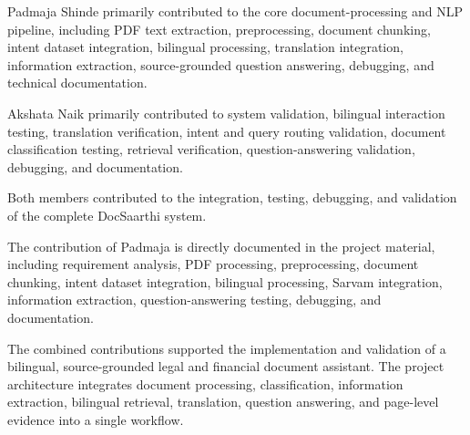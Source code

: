 Padmaja Shinde primarily contributed to the core document-processing
and NLP pipeline, including PDF text extraction, preprocessing,
document chunking, intent dataset integration, bilingual processing,
translation integration, information extraction, source-grounded
question answering, debugging, and technical documentation.

Akshata Naik primarily contributed to system validation, bilingual
interaction testing, translation verification, intent and query
routing validation, document classification testing, retrieval
verification, question-answering validation, debugging, and
documentation.

Both members contributed to the integration, testing, debugging, and
validation of the complete DocSaarthi system.

The contribution of Padmaja is directly documented in the project
material, including requirement analysis, PDF processing,
preprocessing, document chunking, intent dataset integration,
bilingual processing, Sarvam integration, information extraction,
question-answering testing, debugging, and documentation.


The combined contributions supported the implementation and
validation of a bilingual, source-grounded legal and financial
document assistant. The project architecture integrates document
processing, classification, information extraction, bilingual
retrieval, translation, question answering, and page-level evidence
into a single workflow.

